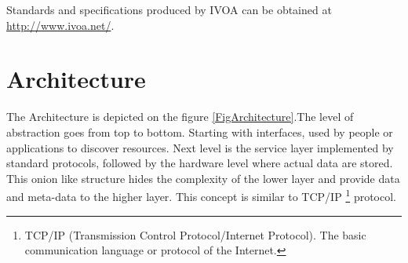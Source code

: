     Standards and specifications produced by IVOA can be obtained at
    \url{http://www.ivoa.net/}.



\section{Architecture}


The Architecture is depicted on the figure \ref{FigArchitecture}.The
level of abstraction goes from top to bottom. Starting with interfaces,
used by people or applications to discover resources.  Next level is
the service layer implemented by standard protocols, followed by the
hardware level where actual data are stored. This onion like structure
hides the complexity of the lower layer and provide data and meta-data
to the higher layer. This concept is similar to TCP/IP
\footnote{TCP/IP (Transmission Control Protocol/Internet Protocol).
  The basic communication language or protocol of the Internet.}
protocol.


